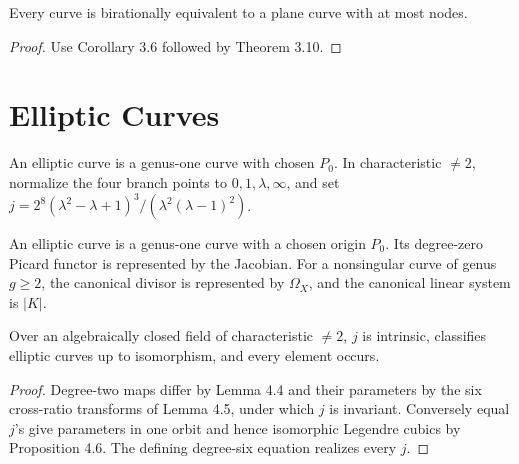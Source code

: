 \begin{corollary}\label{ha-ch4-c311}
Every curve is birationally equivalent to a plane curve with at most nodes.
\end{corollary}
\begin{proof}
Use Corollary 3.6 followed by Theorem 3.10.
\end{proof}

\section{Elliptic Curves}
\label{ha-ch4-s4}
\begin{definition}\label{ha-ch4-d4}
An elliptic curve is a genus-one curve with chosen \(P_0\).  In characteristic
\(\ne2\), normalize the four branch points to \(0,1,\lambda,\infty\), and set
\(j=2^8(\lambda^2-\lambda+1)^3/(\lambda^2(\lambda-1)^2)\).
\end{definition}

\begin{definition}
\label{ha-ch4-def-elliptic-data}
An elliptic curve is a genus-one curve with a chosen origin $P_0$.  Its
degree-zero Picard functor is represented by the Jacobian.  For a nonsingular
curve of genus $g\ge2$, the canonical divisor is represented by
$\Omega_X$, and the canonical linear system is $|K|$.
\end{definition}

\begin{theorem}\label{ha-ch4-t41}
Over an algebraically closed field of characteristic \(\ne2\), \(j\) is
intrinsic, classifies elliptic curves up to isomorphism, and every element
occurs.
\end{theorem}
\begin{proof}
Degree-two maps differ by Lemma 4.4 and their parameters by the six
cross-ratio transforms of Lemma 4.5, under which \(j\) is invariant.
Conversely equal \(j\)'s give parameters in one orbit and hence isomorphic
Legendre cubics by Proposition 4.6.  The defining degree-six equation realizes
every \(j\).
\end{proof}

